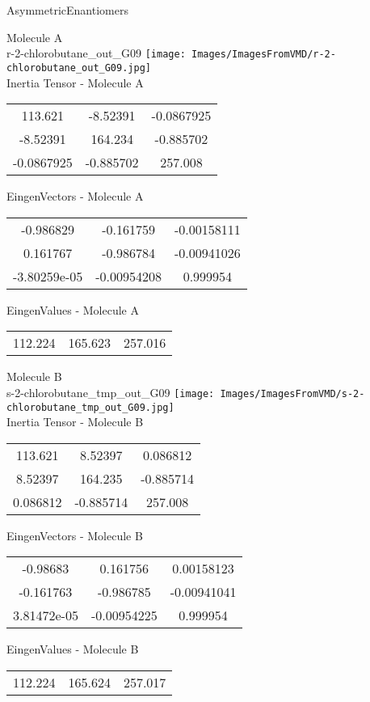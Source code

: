 \vtab[-2cm]
\begin{center}
{\large AsymmetricEnantiomers}
\end{center}
\begin{multicols}{2}
\begin{center}
Molecule A \\ 
r-2-chlorobutane\_out\_G09
\texttt{[image: Images/ImagesFromVMD/r-2-chlorobutane\_out\_G09.jpg]}
\\
Inertia Tensor - Molecule A \\
\vtab
\begin{tabular}{|c c c|}
113.621	 & 	-8.52391	 & 	-0.0867925	 \\
-8.52391	 & 	164.234	 & 	-0.885702	 \\
-0.0867925	 & 	-0.885702	 & 	257.008
\end{tabular}

\vtab
 EingenVectors - Molecule A     \\
\vtab
\begin{tabular}{|c c c|}
-0.986829	 & 	-0.161759	 & 	-0.00158111	 \\
0.161767	 & 	-0.986784	 & 	-0.00941026	 \\
-3.80259e-05	 & 	-0.00954208	 & 	0.999954
\end{tabular}

\vtab
 EingenValues - Molecule A     \\
\vtab
\begin{tabular}{|c c c|}
112.224	 & 	165.623	 & 	257.016
\end{tabular}
\columnbreak

Molecule B \\ 
s-2-chlorobutane\_tmp\_out\_G09
\texttt{[image: Images/ImagesFromVMD/s-2-chlorobutane\_tmp\_out\_G09.jpg]}
\\
Inertia Tensor - Molecule B \\
\vtab
\begin{tabular}{|c c c|}
113.621	 & 	8.52397	 & 	0.086812	 \\
8.52397	 & 	164.235	 & 	-0.885714	 \\
0.086812	 & 	-0.885714	 & 	257.008
\end{tabular}

\vtab
 EingenVectors - Molecule B     \\
\vtab
\begin{tabular}{|c c c|}
-0.98683	 & 	0.161756	 & 	0.00158123	 \\
-0.161763	 & 	-0.986785	 & 	-0.00941041	 \\
3.81472e-05	 & 	-0.00954225	 & 	0.999954
\end{tabular}

\vtab
 EingenValues - Molecule B     \\
\vtab
\begin{tabular}{|c c c|}
112.224	 & 	165.624	 & 	257.017
\end{tabular}

\end{center}
\end{multicols}
